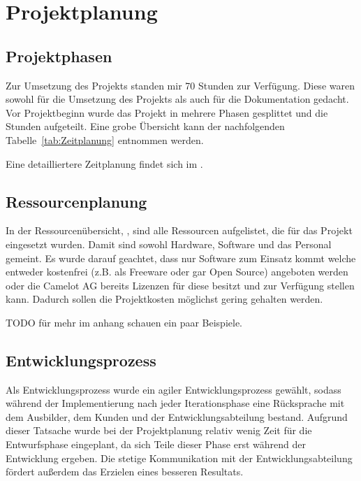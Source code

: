 \section{Projektplanung} 
\label{sec:Projektplanung}

\subsection{Projektphasen}
\label{sec:Projektphasen}
Zur Umsetzung des Projekts standen mir 70 Stunden zur Verfügung. Diese waren sowohl für die Umsetzung des Projekts als auch für die Dokumentation gedacht. Vor Projektbeginn wurde das Projekt in mehrere Phasen gesplittet und die Stunden aufgeteilt. Eine grobe Übersicht kann der nachfolgenden Tabelle~\ref{tab:Zeitplanung} entnommen werden. 

Eine detailliertere Zeitplanung findet sich im .

\subsection{Ressourcenplanung}
\label{sec:Ressourcenplanung}
In der Ressourcenübersicht, , sind alle Ressourcen aufgelistet, die für das Projekt eingesetzt wurden. Damit sind sowohl Hardware, Software und das Personal gemeint. Es wurde darauf geachtet, dass nur Software zum Einsatz kommt welche entweder kostenfrei (z.B. als Freeware oder gar Open Source) angeboten werden oder die Camelot AG bereits Lizenzen für diese besitzt und zur Verfügung stellen kann. Dadurch sollen die Projektkosten möglichst gering gehalten werden. 

TODO für mehr im anhang schauen ein paar Beispiele.

\subsection{Entwicklungsprozess}
\label{sec:Entwicklungsprozess}
Als Entwicklungsprozess wurde ein agiler Entwicklungsprozess gewählt, sodass während der Implementierung nach jeder Iterationsphase eine Rücksprache mit dem Ausbilder, dem Kunden und der Entwicklungsabteilung bestand. Aufgrund dieser Tatsache wurde bei der Projektplanung relativ wenig Zeit für die Entwurfsphase eingeplant, da sich Teile dieser Phase erst während der Entwicklung ergeben. Die stetige Kommunikation mit der Entwicklungsabteilung fördert außerdem das Erzielen eines besseren Resultats.
